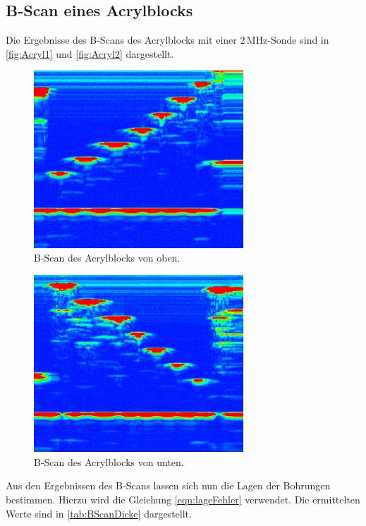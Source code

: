 \subsection{B-Scan eines Acrylblocks}
Die Ergebnisse des B-Scans des Acrylblocks mit einer $2\,\unit{\mega\hertz}$-Sonde sind in \autoref{fig:Acryl1} und \autoref{fig:Acryl2} dargestellt.
\begin{figure}[H]
  \centering
  \includegraphics[width=0.7\textwidth]{data/oben.jpeg}
  \caption{B-Scan des Acrylblocks von oben.}
  \label{fig:Acryl1}
\end{figure}

\begin{figure}[H]
  \centering
  \includegraphics[width=0.7\textwidth]{data/unten.jpeg}
  \caption{B-Scan des Acrylblocks von unten.}
  \label{fig:Acryl2}
\end{figure}

Aus den Ergebnissen des B-Scans lassen sich nun die Lagen der Bohrungen bestimmen. Hierzu wird die Gleichung \eqref{eqn:lageFehler} verwendet.
Die ermittelten Werte sind in \autoref{tab:BScanDicke} dargestellt.

